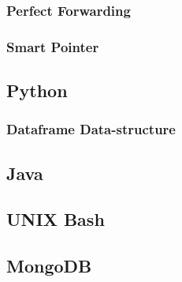 \subsubsection{Perfect Forwarding}
\subsubsection{Smart Pointer}

\subsection{Python}
\subsubsection{Dataframe Data-structure}

\subsection{Java}

\subsection{UNIX Bash}

\subsection{MongoDB}
